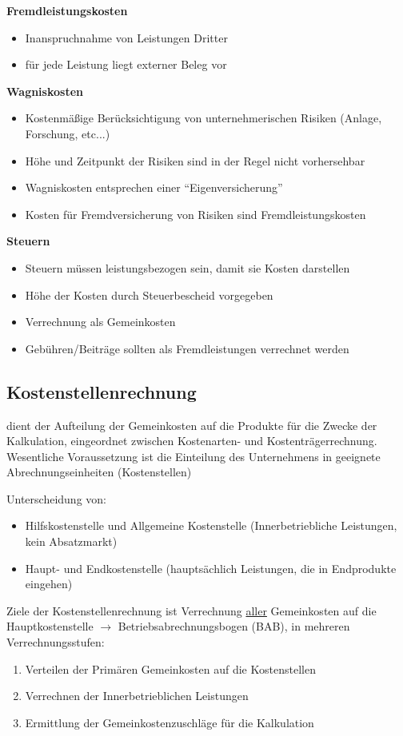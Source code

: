 \documentclass[a4paper,11pt, twoside]{article}
\begin{document}
\textbf{Fremdleistungskosten}
\begin{itemize}
	\item Inanspruchnahme von Leistungen Dritter
	\item für jede Leistung liegt externer Beleg vor
\end{itemize}

\textbf{Wagniskosten}
\begin{itemize}
	\item Kostenmäßige Berücksichtigung von unternehmerischen Risiken (Anlage, Forschung, etc...)
	\item Höhe und Zeitpunkt der Risiken sind in der Regel nicht vorhersehbar
	\item Wagniskosten entsprechen einer "`Eigenversicherung"'
	\item Kosten für Fremdversicherung von Risiken sind Fremdleistungskosten
\end{itemize}

\textbf{Steuern}
\begin{itemize}
	\item Steuern müssen leistungsbezogen sein, damit sie Kosten darstellen
	\item Höhe der Kosten durch Steuerbescheid vorgegeben
	\item Verrechnung als Gemeinkosten
	\item Gebühren/Beiträge sollten als Fremdleistungen verrechnet werden
\end{itemize}

\subsection{Kostenstellenrechnung}
dient der Aufteilung der Gemeinkosten auf die Produkte für die Zwecke der Kalkulation, eingeordnet zwischen Kostenarten- und Kostenträgerrechnung. Wesentliche Voraussetzung ist die Einteilung des Unternehmens in geeignete Abrechnungseinheiten (Kostenstellen)

Unterscheidung von:
\begin{itemize}
	\item Hilfskostenstelle und Allgemeine Kostenstelle (Innerbetriebliche Leistungen, kein Absatzmarkt)
	\item Haupt- und Endkostenstelle (hauptsächlich Leistungen, die in Endprodukte eingehen)
\end{itemize}

Ziele der Kostenstellenrechnung ist Verrechnung \underline{aller} Gemeinkosten auf die Hauptkostenstelle
$\rightarrow$ Betriebsabrechnungsbogen (BAB), in mehreren Verrechnungsstufen:
\begin{enumerate}
	\item Verteilen der Primären Gemeinkosten auf die Kostenstellen
	\item Verrechnen der Innerbetrieblichen Leistungen
	\item Ermittlung der Gemeinkostenzuschläge für die Kalkulation
\end{enumerate}
\end{document}
